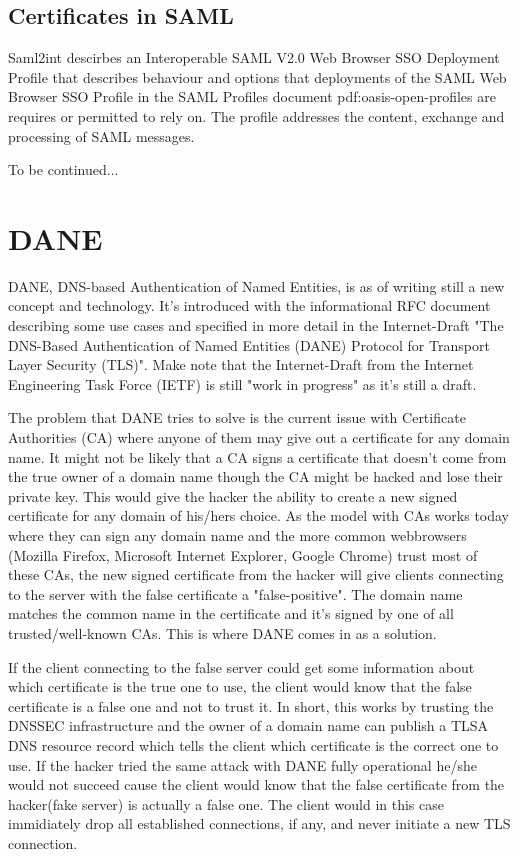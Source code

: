\subsection{Certificates in SAML}

Saml2int\cite{website:saml2int} descirbes an Interoperable SAML V2.0 Web Browser SSO Deployment Profile that describes behaviour and
options that deployments of the SAML Web Browser SSO Profile in the SAML Profiles document {pdf:oasis-open-profiles} are requires or 
permitted to rely on. The profile addresses the content, exchange and processing of SAML messages. 

To be continued...


\section{DANE} 
DANE, DNS-based Authentication of Named Entities, is as of writing still a new concept and technology.
It's introduced with the informational RFC document\cite{rfc:6394} describing some use cases and specified in more detail in the Internet-Draft "The DNS-Based Authentication of Named Entities (DANE) Protocol for Transport Layer Security (TLS)"\cite{rfc:draft-dane}.
Make note that the Internet-Draft from the Internet Engineering Task Force (IETF) is still "work in progress" as it's still a draft.

The problem that DANE tries to solve is the current issue with Certificate Authorities (CA) where anyone of them may give out a certificate for any domain name.
It might not be likely that a CA signs a certificate that doesn't come from the true owner of a domain name though the CA might be hacked and lose their private key. 
This would give the hacker the ability to create a new signed certificate for any domain of his/hers choice.
As the model with CAs works today where they can sign any domain name and the more common webbrowsers (Mozilla Firefox, Microsoft Internet Explorer, Google Chrome) trust most of these CAs, the new signed certificate from the hacker will give clients connecting to the server with the false certificate a "false-positive".
The domain name matches the common name in the certificate and it's signed by one of all trusted/well-known CAs.
This is where DANE comes in as a solution.

If the client connecting to the false server could get some information about which certificate is the true one to use, the client would know that the false certificate is a false one and not to trust it.
In short, this works by trusting the DNSSEC infrastructure and the owner of a domain name can publish a TLSA DNS resource record which tells the client which certificate is the correct one to use.
If the hacker tried the same attack with DANE fully operational he/she would not succeed cause the client would know that the false certificate from the hacker(fake server) is actually a false one.
The client would in this case immidiately drop all established connections, if any, and never initiate a new TLS connection.

